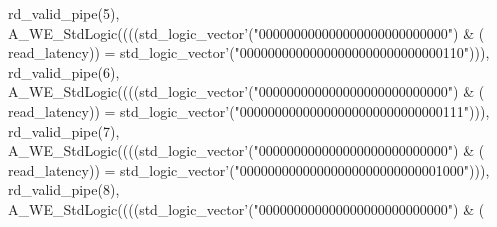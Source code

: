 \begin{DoxyCode}
{      rd_valid_pipe}\textcolor{vhdlchar}{(}\textcolor{vhdllogic}{}\textcolor{vhdllogic}{5}\textcolor{vhdlchar}{)}\textcolor{vhdlchar}{,} \textcolor{vhdlchar}{A\_WE\_StdLogic}\textcolor{vhdlchar}{(}\textcolor{vhdlchar}{(}\textcolor{vhdlchar}{(}\textcolor{vhdlchar}{(}\textcolor{comment}{std\_logic\_vector}\textcolor{vhdlchar}{'}\textcolor{vhdlchar}{(}\textcolor{vhdllogic}{"000000000000000000000000000"}\textcolor{vhdlchar}{)} \textcolor{vhdlchar}{&} \textcolor{vhdlchar}{(}\textcolor{vhdlchar}{
      read_latency}\textcolor{vhdlchar}{)}\textcolor{vhdlchar}{)} \textcolor{vhdlchar}{=} \textcolor{comment}{std\_logic\_vector}\textcolor{vhdlchar}{'}\textcolor{vhdlchar}{(}\textcolor{vhdllogic}{"00000000000000000000000000000110"}\textcolor{vhdlchar}{)}\textcolor{vhdlchar}{)}\textcolor{vhdlchar}{)}\textcolor{vhdlchar}{,} \textcolor{vhdlchar}{
      rd_valid_pipe}\textcolor{vhdlchar}{(}\textcolor{vhdllogic}{}\textcolor{vhdllogic}{6}\textcolor{vhdlchar}{)}\textcolor{vhdlchar}{,} \textcolor{vhdlchar}{A\_WE\_StdLogic}\textcolor{vhdlchar}{(}\textcolor{vhdlchar}{(}\textcolor{vhdlchar}{(}\textcolor{vhdlchar}{(}\textcolor{comment}{std\_logic\_vector}\textcolor{vhdlchar}{'}\textcolor{vhdlchar}{(}\textcolor{vhdllogic}{"000000000000000000000000000"}\textcolor{vhdlchar}{)} \textcolor{vhdlchar}{&} \textcolor{vhdlchar}{(}\textcolor{vhdlchar}{
      read_latency}\textcolor{vhdlchar}{)}\textcolor{vhdlchar}{)} \textcolor{vhdlchar}{=} \textcolor{comment}{std\_logic\_vector}\textcolor{vhdlchar}{'}\textcolor{vhdlchar}{(}\textcolor{vhdllogic}{"00000000000000000000000000000111"}\textcolor{vhdlchar}{)}\textcolor{vhdlchar}{)}\textcolor{vhdlchar}{)}\textcolor{vhdlchar}{,} \textcolor{vhdlchar}{
      rd_valid_pipe}\textcolor{vhdlchar}{(}\textcolor{vhdllogic}{}\textcolor{vhdllogic}{7}\textcolor{vhdlchar}{)}\textcolor{vhdlchar}{,} \textcolor{vhdlchar}{A\_WE\_StdLogic}\textcolor{vhdlchar}{(}\textcolor{vhdlchar}{(}\textcolor{vhdlchar}{(}\textcolor{vhdlchar}{(}\textcolor{comment}{std\_logic\_vector}\textcolor{vhdlchar}{'}\textcolor{vhdlchar}{(}\textcolor{vhdllogic}{"000000000000000000000000000"}\textcolor{vhdlchar}{)} \textcolor{vhdlchar}{&} \textcolor{vhdlchar}{(}\textcolor{vhdlchar}{
      read_latency}\textcolor{vhdlchar}{)}\textcolor{vhdlchar}{)} \textcolor{vhdlchar}{=} \textcolor{comment}{std\_logic\_vector}\textcolor{vhdlchar}{'}\textcolor{vhdlchar}{(}\textcolor{vhdllogic}{"00000000000000000000000000001000"}\textcolor{vhdlchar}{)}\textcolor{vhdlchar}{)}\textcolor{vhdlchar}{)}\textcolor{vhdlchar}{,} \textcolor{vhdlchar}{
      rd_valid_pipe}\textcolor{vhdlchar}{(}\textcolor{vhdllogic}{}\textcolor{vhdllogic}{8}\textcolor{vhdlchar}{)}\textcolor{vhdlchar}{,} \textcolor{vhdlchar}{A\_WE\_StdLogic}\textcolor{vhdlchar}{(}\textcolor{vhdlchar}{(}\textcolor{vhdlchar}{(}\textcolor{vhdlchar}{(}\textcolor{comment}{std\_logic\_vector}\textcolor{vhdlchar}{'}\textcolor{vhdlchar}{(}\textcolor{vhdllogic}{"000000000000000000000000000"}\textcolor{vhdlchar}{)} \textcolor{vhdlchar}{&} \textcolor{vhdlchar}{(}\textcolor{vhdlchar}{
}
\end{DoxyCode}
